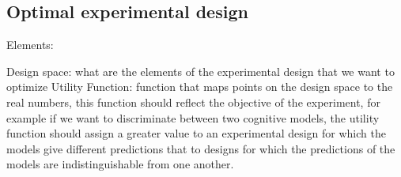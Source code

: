 \documentclass[preprint,review,12pt]{elsarticle}
\begin{document}
% 
% 

\subsection{Optimal experimental design}

Elements:

Design space: what are the elements of the experimental design that we want to optimize
Utility Function: function that maps points on the design space to the real numbers, this function should reflect the objective of the experiment, for example if we want to discriminate between two cognitive models, the utility function should assign a greater value to an experimental design for which the models give different predictions that to designs for which the predictions of the models are indistinguishable from one another.




\end{document}
